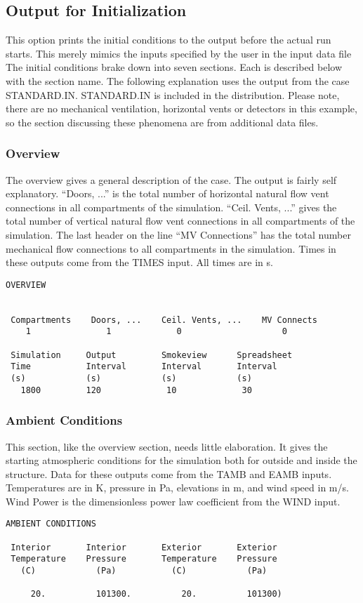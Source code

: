 \subsection{Output for Initialization}

This option prints the initial conditions to the output before the actual run starts.  This merely mimics the inputs specified by the user in the input data file  The initial conditions brake down into seven sections.  Each is described below with the section name. The following explanation uses the output from the case STANDARD.IN. STANDARD.IN is included in the distribution. Please note, there are no mechanical ventilation, horizontal vents or detectors in this example, so the section discussing these phenomena are from additional data files.

\subsubsection{Overview}

The overview gives a general description of the case.  The output is fairly self explanatory. ``Doors, ...'' is the total number of horizontal natural flow vent connections in all compartments of the simulation.  ``Ceil. Vents, ...'' gives the total number of vertical natural flow vent connections in all compartments of the simulation.  The last header on the line ``MV Connections'' has the total number mechanical flow connections to all compartments in the simulation. Times in these outputs come from the TIMES input. All times are in s.
\begin{lstlisting}[basicstyle=\scriptsize]
 OVERVIEW


 Compartments    Doors, ...    Ceil. Vents, ...    MV Connects
    1               1             0                    0

 Simulation     Output         Smokeview      Spreadsheet
 Time           Interval       Interval       Interval
 (s)            (s)            (s)            (s)
   1800         120             10             30
\end{lstlisting}

\subsubsection{Ambient Conditions}

This section, like the overview section, needs little elaboration.  It gives the starting atmospheric conditions for the simulation both for outside and inside the structure. Data for these outputs come from the TAMB and EAMB inputs. Temperatures are in K, pressure in Pa, elevations in m, and wind speed in m/s. Wind Power is the dimensionless power law coefficient from the WIND input.
\begin{lstlisting}[basicstyle=\scriptsize]
 AMBIENT CONDITIONS

 Interior       Interior       Exterior       Exterior
 Temperature    Pressure       Temperature    Pressure
   (C)            (Pa)           (C)            (Pa)

     20.          101300.          20.          101300)
\end{lstlisting}

